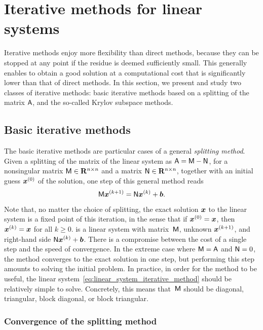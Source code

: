 \section{Iterative methods for linear systems}%
\label{sec:iterative_methods}
Iterative methods enjoy more flexibility than direct methods,
because they can be stopped at any point if the residue is deemed sufficiently small.
This generally enables to obtain a good solution at a computational cost that is significantly lower than that of direct methods.
In this section,
we present and study two classes of iterative methods:
basic iterative methods based on a splitting of the matrix $\mathsf A$,
and the so-called Krylov subspace methods.

\subsection{Basic iterative methods}%
\label{sub:basic_iterative_methods}
The basic iterative methods are particular cases of a general \emph{splitting method}.
Given a splitting of the matrix of the linear system as $\mathsf A = \mathsf M - \mathsf N$,
for a nonsingular matrix $\mathsf M \in \mathbf R^{n \times n}$ and a matrix $\mathsf N \in  \mathbf R^{n \times n}$,
together with an initial guess $\mathbf{\boldsymbol{x}}^{(0)}$ of the solution,
one step of this general method reads
\begin{equation}
    \label{eq:linear_system_iterative_method}
    \mathsf M \mathbf{\boldsymbol{x}}^{(k+1)} = \mathsf N \mathbf{\boldsymbol{x}}^{(k)} + \mathbf{\boldsymbol{b}}.
\end{equation}
Note that, no matter the choice of splitting,
the exact solution $\mathbf{\boldsymbol{x}}$ to the linear system is a fixed point of this iteration,
in the sense that if $\mathbf{\boldsymbol{x}}^{(0)} = \mathbf{\boldsymbol{x}}$, then $\mathbf{\boldsymbol{x}}^{(k)} = \mathbf{\boldsymbol{x}}$ for all $k \geq 0$.
 is a linear system with matrix~$\mathsf M$,
unknown $\mathbf{\boldsymbol{x}}^{(k+1)}$, and right-hand side $\mathsf N \mathbf{\boldsymbol{x}}^{(k)} + \mathbf{\boldsymbol{b}}$.
There is a compromise between the cost of a single step and the speed of convergence.
In the extreme case where $\mathsf M = \mathsf A$ and $\mathsf N = 0$,
the method converges to the exact solution in one step,
but performing this step amounts to solving the initial problem.
In practice, in order for the method to be useful,
the linear system~\eqref{eq:linear_system_iterative_method} should be relatively simple to solve.
Concretely, this means that~$\mathsf M$ should be diagonal, triangular, block diagonal, or block triangular.

\subsubsection{Convergence of the splitting method}%
\label{ssub:convergence_of_the_basic_splitting_method}

